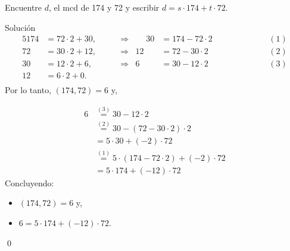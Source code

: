 \documentclass[handout]{beamer} %
\begin{document}
    
    
    \begin{frame}
        \begin{ejemplo} Encuentre $d$, el mcd de 174 y 72 y  escribir $d = s \cdot 174 + t \cdot 72$.
        \end{ejemplo}\pause
        {\color{blue} Solución}
        \pause 
        \begin{alignat*}5
            174&=72\cdot 2+30,& \;\quad&\Rightarrow&  \;\quad 30 &=     174-72\cdot 2& &\; &\quad\quad\quad&(1)\\
            72&=30\cdot 2+12,& \;&\Rightarrow& 12&=72-30\cdot 2& \; & \; &&(2) \\
            30&=12\cdot 2+6,& \;&\Rightarrow& 6&=    30-12\cdot 2& \; & \; &&(3)\\
            12&=6\cdot 2+0.& \;&&  && &&\\
        \end{alignat*} \pause \vskip -1.0cm
        Por lo tanto,     $(174,72) = 6$ y,
    \end{frame}
    
    
    
    \begin{frame}
        \begin{align*}
            6&\stackrel{(3)}{=}    30-12\cdot 2\\
            &\stackrel{(2)}{=}    30-(72-30\cdot 2)\cdot 2 \\  
            &=    5 \cdot 30 + (-2) \cdot 72\\  
            &\stackrel{(1)}{=} 5 \cdot (    174-72\cdot 2) + (-2) \cdot 72\\   
            &=  5\cdot 174+ (-12) \cdot 72  
        \end{align*}
        \pause
        Concluyendo: 
        \begin{itemize}
            \item     $(174,72) = 6$ y,
            \item  $6= 5\cdot 174+ (-12) \cdot 72$.
        \end{itemize}
        \qed
        
        \vskip 2cm
        
    \end{frame}
    
\end{document}
